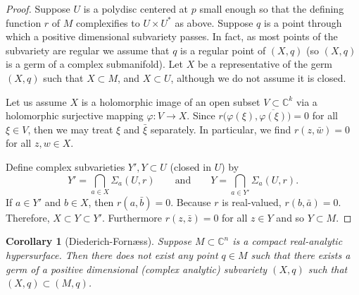 \documentclass[12pt,openany]{book}
\newcommand{\C}{{\mathbb{C}}}
\theoremstyle{plain}
\newtheorem{cor}[thm]{Corollary}
\theoremstyle{remark}
\theoremstyle{definition}
\theoremstyle{exercise}
\theoremstyle{example}
\begin{document}
\begin{proof}
Suppose $U$ is a polydisc centered at $p$
small enough so that the defining function
$r$ of $M$ complexifies to $U \times U^*$ as above.
Suppose $q$ is a point through which a positive dimensional subvariety
passes.
In fact, as most points of the subvariety are regular we 
assume that $q$ is a regular point of $(X,q)$ (so $(X,q)$ is a germ of a
complex submanifold).
Let $X$ be a representative of the germ $(X,q)$ such that $X \subset M$,
and $X \subset U$, although we do not assume it is closed.


Let us assume $X$ is a holomorphic
image of an open subset $V \subset \C^k$ via a holomorphic surjective mapping $\varphi \colon V \to
X$.  Since $r\bigl(\varphi(\xi),\overline{\varphi(\xi)}\bigr) = 0$
for all $\xi \in V$, then we may treat $\xi$ and $\bar{\xi}$ separately.
In particular, we find 
$r(z,\bar{w}) = 0$ for all $z,w \in X$.

Define complex subvarieties $Y', Y \subset U$ (closed in $U$) by
\begin{equation*}
Y' = \bigcap_{a \in X} \Sigma_a(U,r) 
\qquad \text{and} \qquad
Y = \bigcap_{a \in Y'} \Sigma_a(U,r) .
\end{equation*}
If $a \in Y'$ and $b \in X$, then $r(a,\bar{b}) = 0$.
Because $r$ is real-valued,
$r(b,\bar{a}) = 0$.  Therefore,
$X \subset Y \subset Y'$.  Furthermore $r(z,\bar{z}) = 0$
for all $z \in Y$ and so $Y \subset M$.
\end{proof}

\begin{cor}[Diederich-Forn\ae ss]
Suppose $M \subset \C^n$ is a compact real-analytic hypersurface.
Then there does not exist any point $q \in M$ such that
there exists a germ of a positive dimensional (complex analytic) subvariety
$(X,q)$ such that $(X,q) \subset (M,q)$.
\end{cor}
\end{document}
